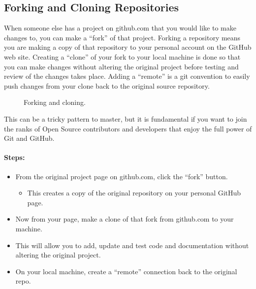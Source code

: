\subsection{Forking and Cloning Repositories}
\justify{}
When someone else has a project on github.com that you would like to make changes to,
you can make a ``fork'' of that project. Forking a repository means you
are making a copy of that repository to your personal account on the GitHub web site.
\justify{}
Creating a ``clone'' of your fork to your local machine is done so that
you can make changes without altering the original project before testing and review of the changes takes place.
\justify{}
Adding a ``remote'' is a git convention to easily push changes from your clone back to
the original source repository.

\begin{figure}[!htb]

\caption{Forking and cloning.}
\label{forkandclone}
\end{figure}

\justify{}
This can be a tricky pattern to master, but it is fundamental if you
want to join the ranks of Open Source contributors and developers that
enjoy the full power of Git and GitHub.

\paragraph{Steps:}

\begin{itemize}
      \item
            From the original project page on github.com, click the ``fork'' button.
            \begin{itemize}
                  \item
                        This creates a copy of the original repository on your personal
                        GitHub page.
            \end{itemize}
      \item
            Now from your page, make a clone of that fork from github.com to your
            machine.
      \item
            This will allow you to add, update and test code and documentation without altering the original project.
      \item
            On your local machine, create a ``remote'' connection back to the
            original repo.
\end{itemize}

